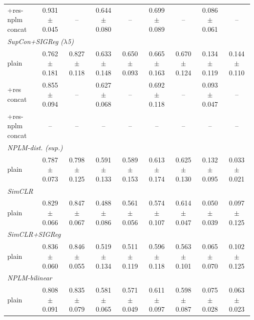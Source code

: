 \begin{landscape}
\begin{center}
\begin{longtable}{lcccccccc}
\quad +res-nplm concat & 0.931$\pm$0.045 & -- & 0.644$\pm$0.080 & -- & 0.699$\pm$0.089 & -- & 0.086$\pm$0.061 & -- \\
\multicolumn{9}{l}{\emph{SupCon+SIGReg ($\lambda$5)}} \\
\quad plain & 0.762$\pm$0.181 & 0.827$\pm$0.118 & 0.633$\pm$0.148 & 0.650$\pm$0.093 & 0.665$\pm$0.163 & 0.670$\pm$0.124 & 0.134$\pm$0.119 & 0.144$\pm$0.110 \\
\quad +res concat & 0.855$\pm$0.094 & -- & 0.627$\pm$0.068 & -- & 0.692$\pm$0.118 & -- & 0.093$\pm$0.047 & -- \\
\quad +res-nplm concat & -- & -- & -- & -- & -- & -- & -- & -- \\
\multicolumn{9}{l}{\emph{NPLM-dist. (sup.)}} \\
\quad plain & 0.787$\pm$0.073 & 0.798$\pm$0.125 & 0.591$\pm$0.133 & 0.589$\pm$0.153 & 0.613$\pm$0.174 & 0.625$\pm$0.130 & 0.132$\pm$0.095 & 0.033$\pm$0.021 \\
\multicolumn{9}{l}{\emph{SimCLR}} \\
\quad plain & 0.829$\pm$0.066 & 0.847$\pm$0.067 & 0.488$\pm$0.086 & 0.561$\pm$0.056 & 0.574$\pm$0.107 & 0.614$\pm$0.047 & 0.050$\pm$0.039 & 0.097$\pm$0.125 \\
\multicolumn{9}{l}{\emph{SimCLR+SIGReg}} \\
\quad plain & 0.836$\pm$0.060 & 0.846$\pm$0.055 & 0.519$\pm$0.134 & 0.511$\pm$0.119 & 0.596$\pm$0.118 & 0.563$\pm$0.101 & 0.065$\pm$0.070 & 0.102$\pm$0.125 \\
\multicolumn{9}{l}{\emph{NPLM-bilinear}} \\
\quad plain & 0.808$\pm$0.091 & 0.835$\pm$0.079 & 0.581$\pm$0.065 & 0.571$\pm$0.049 & 0.611$\pm$0.097 & 0.598$\pm$0.087 & 0.075$\pm$0.028 & 0.063$\pm$0.023 \\
\end{longtable}
\end{center}
\end{landscape}
